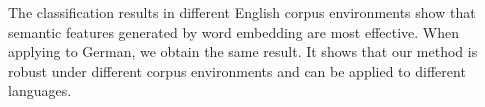 The classification results in different English corpus environments 
show that semantic features generated by word embedding are most effective.
When applying to German, we obtain the same result.
It shows that our method is robust under different corpus environments 
and can be applied to different languages. 


